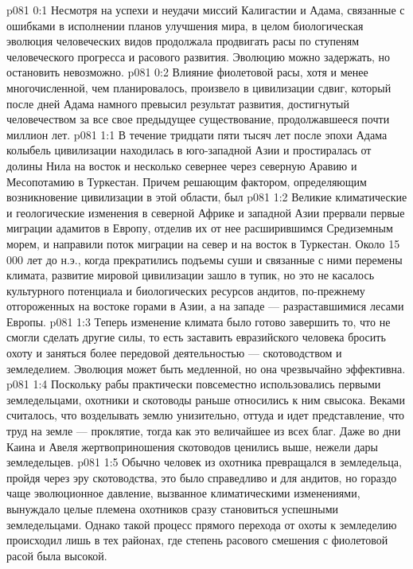 \author{Архангел}
\vs p081 0:1 Несмотря на успехи и неудачи миссий Калигастии и Адама, связанные с ошибками в исполнении планов улучшения мира, в целом биологическая эволюция человеческих видов продолжала продвигать расы по ступеням человеческого прогресса и расового развития. Эволюцию можно задержать, но остановить невозможно.
\vs p081 0:2 Влияние фиолетовой расы, хотя и менее многочисленной, чем планировалось, произвело в цивилизации сдвиг, который после дней Адама намного превысил результат развития, достигнутый человечеством за все свое предыдущее существование, продолжавшееся почти миллион лет.
\vs p081 1:1 В течение тридцати пяти тысяч лет после эпохи Адама колыбель цивилизации находилась в юго\hyp{}западной Азии и простиралась от долины Нила на восток и несколько севернее через северную Аравию и Месопотамию в Туркестан. Причем решающим фактором, определяющим возникновение цивилизации в этой области, был 
\vs p081 1:2 Великие климатические и геологические изменения в северной Африке и западной Азии прервали первые миграции адамитов в Европу, отделив их от нее расширившимся Средиземным морем, и направили поток миграции на север и на восток в Туркестан. Около 15\,000 лет до н.э., когда прекратились подъемы суши и связанные с ними перемены климата, развитие мировой цивилизации зашло в тупик, но это не касалось культурного потенциала и биологических ресурсов андитов, по\hyp{}прежнему отгороженных на востоке горами в Азии, а на западе --- разраставшимися лесами Европы.
\vs p081 1:3 Теперь изменение климата было готово завершить то, что не смогли сделать другие силы, то есть заставить евразийского человека бросить охоту и заняться более передовой деятельностью --- скотоводством и земледелием. Эволюция может быть медленной, но она чрезвычайно эффективна.
\vs p081 1:4 Поскольку рабы практически повсеместно использовались первыми земледельцами, охотники и скотоводы раньше относились к ним свысока. Веками считалось, что возделывать землю унизительно, оттуда и идет представление, что труд на земле --- проклятие, тогда как это величайшее из всех благ. Даже во дни Каина и Авеля жертвоприношения скотоводов ценились выше, нежели дары земледельцев.
\vs p081 1:5 Обычно человек из охотника превращался в земледельца, пройдя через эру скотоводства, это было справедливо и для андитов, но гораздо чаще эволюционное давление, вызванное климатическими изменениями, вынуждало целые племена охотников сразу становиться успешными земледельцами. Однако такой процесс прямого перехода от охоты к земледелию происходил лишь в тех районах, где степень расового смешения с фиолетовой расой была высокой.
